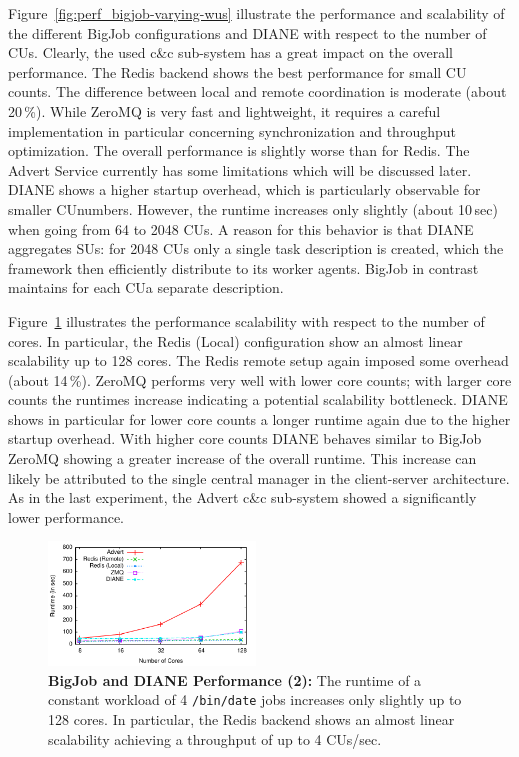 \documentclass[conference,final]{IEEEtran}
\newcommand{\cu}{CU}
\newcommand{\upp}{\vspace*{-0.5em}}
\begin{document}
Figure~\ref{fig:perf_bigjob-varying-wus} illustrate the performance and
scalability of the different BigJob configurations and DIANE with respect to the
number of \cu s. Clearly, the used c\&c sub-system has a great impact on the
overall performance. The Redis backend shows the best performance for small \cu 
counts. The difference between local and remote coordination is moderate (about
20\,\%). While ZeroMQ is very fast and lightweight, it requires a careful
implementation in particular concerning synchronization and throughput
optimization. The overall performance is slightly worse than for Redis. The
Advert Service currently has some limitations which will be discussed later.
DIANE shows a higher startup overhead, which is particularly observable for
smaller \cu  numbers. However, the runtime increases only slightly (about 10\,sec)
when going from 64 to 2048 \cu s. A reason for this behavior is that DIANE
aggregates SUs: for 2048 \cu s only a single task description is created, which
the framework then efficiently distribute to its worker agents. BigJob in
contrast maintains for each \cu  a separate description. 

Figure~\ref{fig:perf_bigjob-varying-cores} illustrates the performance
scalability with respect to the number of cores. In particular, the Redis
(Local) configuration show an almost linear scalability up to 128 cores. The
Redis remote setup again imposed some overhead (about 14\,\%). ZeroMQ performs
very well with lower core counts; with larger core counts the runtimes increase
indicating a potential scalability bottleneck. DIANE shows in particular for
lower core counts a longer runtime again due to the higher startup overhead.
With higher core counts DIANE behaves similar to BigJob ZeroMQ showing a greater
increase of the overall runtime. This increase can likely be attributed to
the single central manager in the client-server architecture. As in the last
experiment, the Advert c\&c sub-system showed a significantly lower performance.

\begin{figure}[htbp] \centering
\includegraphics[width=0.49\textwidth]{perf/bigjob-varying-cores-alamo.pdf}
\caption{\textbf{BigJob and DIANE Performance (2):}  The
runtime of a constant workload of 4 \texttt{/bin/date} jobs 
increases only slightly up to 128 cores. In particular, the Redis backend shows
an almost linear scalability achieving a throughput of up to 4 \cu s/sec. }
\label{fig:perf_bigjob-varying-cores} 
\upp\upp
\end{figure}
\end{document}
